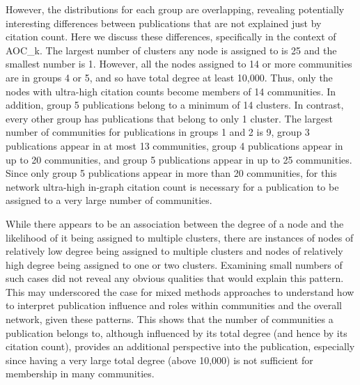 \documentclass[12pt, oneside]{article}   	%
\begin{document}
	However, the distributions for each group are overlapping, revealing potentially interesting differences between publications that are not
	explained just by citation count. 
	Here we discuss these differences, specifically in the context of AOC\_k. 
	The largest number of clusters any node is assigned to is 25 and the smallest number is 1.
	However, all the nodes assigned to 14 or more communities are in groups 4 or 5, and so have total degree at least 10,000.
	Thus,  only the nodes with ultra-high citation counts become members of 14 communities.
	In addition, group 5 publications belong to a minimum of 14 clusters.  
	In contrast, every other group has publications that belong to only 1 cluster. 
	The largest number of communities for publications in groups 1 and 2 is  9, %
	group 3 publications appear in at most 13 communities, %
	group 4 publications appear in up to 20 communities, %
	and group 5 publications appear in up to 25 communities. 
	Since only group 5 publications appear in more than 20 communities, for this network ultra-high in-graph citation count is  necessary  for a publication to be assigned to a very large number of communities.  
	
	While there appears to be an association between the degree of a node and the likelihood of it being assigned to multiple clusters, there are instances of nodes of relatively low degree being assigned to multiple clusters and nodes of relatively high degree being assigned to one or two clusters. Examining small numbers of such cases did not reveal any obvious qualities that would explain this pattern. This may underscored the case for mixed methods approaches to understand how to interpret publication influence and roles within communities and the overall network, given these patterns. This shows that  the number of communities a publication belongs to, although influenced by its total degree (and hence by its citation count), provides an additional perspective into the publication, especially since having a very large total degree (above 10,000) is not sufficient  for membership in many communities. 
	
\end{document}

